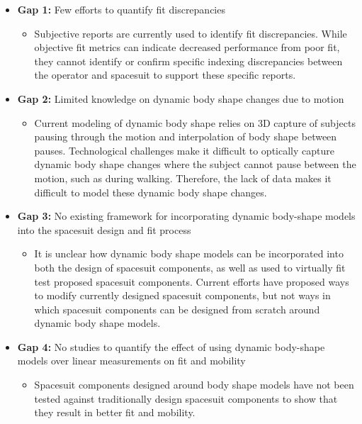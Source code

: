 \documentclass[defaultstyle,11pt]{comps}
\providecommand{\tightlist}{%
  \setlength{\itemsep}{0pt}\setlength{\parskip}{0pt}}
\begin{document}
\begin{itemize}
\tightlist
\item
  \textbf{Gap 1:} Few efforts to quantify fit discrepancies

  \begin{itemize}
  \tightlist
  \item
    Subjective reports are currently used to identify fit discrepancies.
    While objective fit metrics can indicate decreased performance from poor fit, they cannot identify or confirm specific indexing discrepancies between the operator and spacesuit to support these specific reports.
  \end{itemize}
\item
  \textbf{Gap 2:} Limited knowledge on dynamic body shape changes due to motion

  \begin{itemize}
  \tightlist
  \item
    Current modeling of dynamic body shape relies on 3D capture of subjects pausing through the motion and interpolation of body shape between pauses.
    Technological challenges make it difficult to optically capture dynamic body shape changes where the subject cannot pause between the motion, such as during walking.
    Therefore, the lack of data makes it difficult to model these dynamic body shape changes.
  \end{itemize}
\item
  \textbf{Gap 3:} No existing framework for incorporating dynamic body-shape models into the spacesuit design and fit process

  \begin{itemize}
  \tightlist
  \item
    It is unclear how dynamic body shape models can be incorporated into both the design of spacesuit components, as well as used to virtually fit test proposed spacesuit components.
    Current efforts have proposed ways to modify currently designed spacesuit components, but not ways in which spacesuit components can be designed from scratch around dynamic body shape models.
  \end{itemize}
\item
  \textbf{Gap 4:} No studies to quantify the effect of using dynamic body-shape models over linear measurements on fit and mobility

  \begin{itemize}
  \tightlist
  \item
    Spacesuit components designed around body shape models have not been tested against traditionally design spacesuit components to show that they result in better fit and mobility.
  \end{itemize}
\end{itemize}
\end{document}
